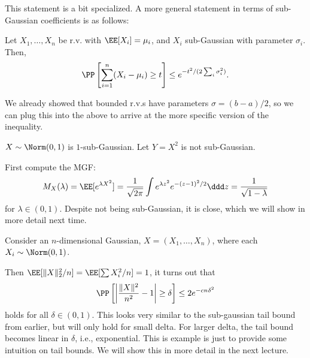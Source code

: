 This statement is a bit specialized. A more general statement in terms of sub-Gaussian coefficients is as follows: 
\begin{theorem}

Let $X_1,\hdots,X_n$ be r.v. with $\EE[X_i]=\mu_i$, and $X_i$ sub-Gaussian with parameter $\sigma_i$. Then, 
\[\PP\left[\sum_{i=1}^n(X_i-\mu_i)\geq t\right]\leq e^{-t^2/(2\sum_i \sigma_i^2)}.\] 
\end{theorem}
\noindent We already showed that bounded r.v.s have parameters $\sigma=(b-a)/2$, so we can plug this into the above to arrive at the more specific version of the inequality.
\begin{example}
\exlabel

$X\sim \Norm(0,1)$ is $1$-sub-Gaussian. Let $Y=X^2$ is not sub-Gaussian. 
\end{example}
First compute the MGF:
\begin{align*}
	M_{X}(\lambda) = \EE[e^{\lambda X^2}] = \frac{1}{\sqrt{2\pi}}\int e^{\lambda z^2}e^{-(z-1)^2/2}\ddd z = \frac{1}{\sqrt{1-\lambda}}
\end{align*}
for $\lambda\in (0,1)$. Despite not being sub-Gaussian, it is close, which we will show in more detail next time. 


\begin{example}
\exlabel

Consider an $n$-dimensional Gaussian, $X = (X_1, \hdots, X_n)$, where each $X_i\sim \Norm(0,1)$. 
\end{example}
Then $\EE[\lVert X\rVert_2^2 / n] = \EE[\sum X_i^2 / n] = 1$, it turns out that 
\[\PP\left[ \left\vert\frac{\lVert X\rVert^2}{n^2} - 1\right\vert \geq \delta\right] \leq 2e^{-cn\delta^2}\] 
holds for all $\delta\in (0,1)$. This looks very similar to the sub-gaussian tail bound from earlier, but will only hold for small delta. For larger delta, the tail bound becomes linear in $\delta$, i.e., exponential. This is example is just to provide some intuition on tail bounds. We will show this in more detail in the next lecture. 

